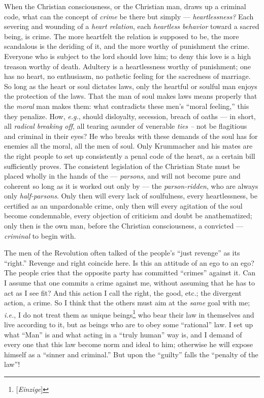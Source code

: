 When the Christian consciousness, or the Christian man, draws up a criminal 
code, what can the concept of \textit{crime} be there but simply --- \textit{heartlessness?} Each severing and wounding of a \textit{heart 
relation}, each \textit{heartless behavior} toward a sacred being, is crime. 
The more heartfelt the relation is supposed to be, the more scandalous is the 
deriding of it, and the more worthy of punishment the crime. Everyone who is 
subject to the lord should love him; to deny this love is a high treason 
worthy of death. Adultery is a heartlessness worthy of punishment; one has no 
heart, no enthusiasm, no pathetic feeling for the sacredness of marriage. So 
long as the heart or soul dictates laws, only the heartful or soulful man 
enjoys the protection of the laws. That the man of soul makes laws means 
properly that the \textit{moral} man makes them: what contradicts these men's 
``moral feeling,'' this they penalize. How, \textit{e.g.}, should 
disloyalty, secession, breach of oaths --- in short, all \textit{radical 
breaking off}, all tearing asunder of venerable \textit{ties --} not be 
flagitious and criminal in their eyes? He who breaks with these demands of the 
soul has for enemies all the moral, all the men of soul. Only Krummacher and 
his mates are the right people to set up consistently a penal code of the 
heart, as a certain bill sufficiently proves. The consistent legislation of 
the Christian State must be placed wholly in the hands of the --- \textit{parsons}, and will not become pure and coherent so long as it is 
worked out only by --- the \textit{parson-ridden}, who are always only 
\textit{half-parsons}. Only then will every lack of soulfulness, every 
heartlessness, be certified as an unpardonable crime, only then will every 
agitation of the soul become condemnable, every objection of criticism and 
doubt be anathematized; only then is the own man, before the Christian 
consciousness, a convicted --- \textit{criminal} to begin with.

The men of the Revolution often talked of the people's ``just revenge'' as 
its ``right.'' Revenge and right coincide here. Is this an attitude of an 
ego to an ego? The people cries that the opposite party has committed 
``crimes'' against it. Can I assume that one commits a crime against me, 
without assuming that he has to act as I see fit? And this action I call the 
right, the good, etc.; the divergent action, a crime. So I think that the 
others must aim at the \textit{same} goal with me; \textit{i.e.}, I do not 
treat them as unique beings\footnote{[\textit{Einzige}]} who bear their law in 
themselves and live according to it, but as beings who are to obey some 
``rational'' law. I set up what ``Man'' is and what acting in a ``truly 
human'' way is, and I demand of every one that this law become norm and ideal 
to him; otherwise he will expose himself as a ``sinner and criminal.'' But 
upon the ``guilty'' falls the ``penalty of the law''!

